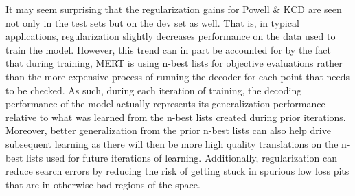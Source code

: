 \documentclass[11pt]{article}
\begin{document}
It may seem surprising that the regularization gains for Powell \& KCD are seen not only in the test sets but on the dev set as well. That is, in typical applications, regularization slightly decreases performance on the data used to train the model. However, this trend can in part be accounted for by the fact that during training, MERT is using n-best lists for objective evaluations rather than the more expensive process of running the decoder for each point that needs to be checked. As such, during each iteration of training, the decoding performance of the model actually represents its generalization performance relative to what was learned from the n-best lists created during prior iterations. Moreover, better generalization from the prior n-best lists can also help drive subsequent learning as there will then be more high quality translations on the n-best lists used for future iterations of learning. Additionally, regularization can reduce search errors by reducing the risk of getting stuck in spurious low loss pits that are in otherwise bad regions of the space.

\end{document}
